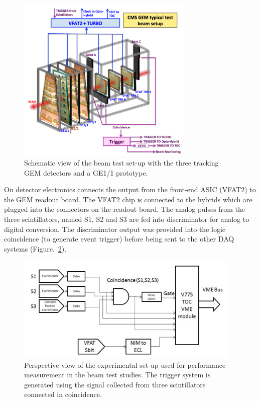 \begin{figure}[!htbp]
\centering
\includegraphics[width=0.75\textwidth]{figures/GEM/tb_exptsetup_copy.png}
\caption{Schematic view of the beam test set-up with the three tracking GEM detectors and a GE1/1 prototype.}\label{fig:daq}
\end{figure}
On detector electronics connects the output from the front-end ASIC (VFAT2) to the GEM readout board.
The VFAT2 chip is connected to the hybrids which are plugged into the connectors on the readout board.
The analog pulses from the three scintillators, named S1, S2 and S3 are fed into discriminator for analog to digital conversion.
The discriminator output was provided into the logic coincidence (to generate event trigger) before being sent to the other DAQ systems (Figure.~\ref{fig:tbs}).
\begin{figure}[!htbp]
\centering
\includegraphics[width=0.95\textwidth]{figures/GEM/daq.png}
\caption{Perspective view of the experimental set-up used for performance measurement in the beam test studies. The trigger system is generated using the signal collected from three scintillators connected in coincidence.}\label{fig:tbs}
\end{figure}
